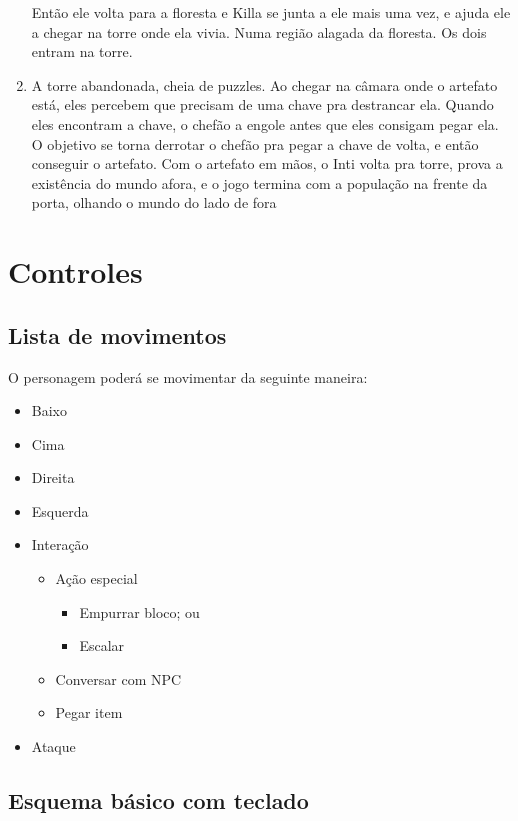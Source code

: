\documentclass[12pt]{article}
\begin{document}
\begin{enumerate}
Então ele volta para a floresta e Killa se junta a ele mais uma vez, e ajuda ele a chegar na torre onde ela vivia. Numa região alagada da floresta. Os dois entram na torre.
\item A torre abandonada, cheia de puzzles. Ao chegar na câmara onde o artefato está, eles percebem que precisam de uma chave pra destrancar ela. Quando eles encontram a chave, o chefão a engole antes que eles consigam pegar ela. O objetivo se torna derrotar o chefão pra pegar a chave de volta, e então conseguir o artefato.
Com o artefato em mãos, o Inti volta pra torre, prova a existência do mundo afora, e o jogo termina com a população na frente da porta, olhando o mundo do lado de fora
\end{enumerate}
\section{Controles}

\subsection{Lista de movimentos}
O personagem poderá se movimentar da seguinte maneira:

\begin{itemize}
    \item Baixo
    \item Cima
    \item Direita
    \item Esquerda
    \item Interação
    \begin{itemize}
        \item Ação especial
        \begin{itemize}
            \item Empurrar bloco; ou
            \item Escalar
        \end{itemize}
        \item Conversar com NPC
        \item Pegar item
    \end{itemize}
    \item Ataque
\end{itemize}

\subsection{Esquema básico com teclado}
\end{document}
